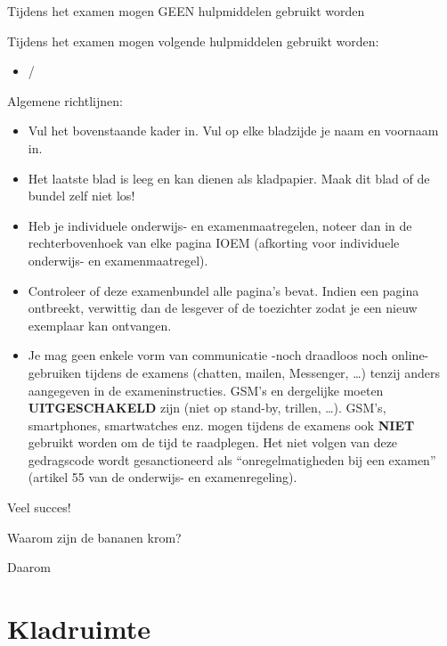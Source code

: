 \documentclass{exam}
\begin{document}
\hoofding


\XBox Tijdens het examen mogen GEEN hulpmiddelen gebruikt worden

\Square Tijdens het examen mogen volgende hulpmiddelen gebruikt worden:
\begin{itemize}
\item /
\end{itemize}

Algemene richtlijnen:

\begin{itemize}
  \item Vul het bovenstaande kader in. Vul op elke bladzijde je naam en voornaam in.
  \item Het laatste blad is leeg en kan dienen als kladpapier. Maak dit blad of de bundel zelf niet los!
  \item Heb je individuele onderwijs- en examenmaatregelen, noteer dan in de rechterbovenhoek van elke pagina IOEM (afkorting voor individuele onderwijs- en examenmaatregel).
  \item Controleer of deze examenbundel alle pagina’s bevat. Indien een pagina ontbreekt, verwittig dan de lesgever of de toezichter zodat je een nieuw exemplaar kan ontvangen.
  \item Je mag geen enkele vorm van communicatie -noch draadloos noch online- gebruiken tijdens de examens (chatten, mailen, Messenger, \ldots) tenzij anders aangegeven in de exameninstructies. GSM's en dergelijke moeten \textbf{UITGESCHAKELD} zijn (niet op stand-by, trillen, \ldots). GSM's, smartphones, smartwatches enz. mogen tijdens de examens ook \textbf{NIET} gebruikt worden om de tijd te raadplegen. Het niet volgen van deze gedragscode wordt gesanctioneerd als ``onregelmatigheden bij een examen'' (artikel 55 van de onderwijs- en examenregeling).
\end{itemize}

Veel succes!

\hrulefill

\begin{questions}

\framedsolutions
\ifsolution
  \printanswers
\else
  \noprintanswers
\fi


\question[10] Waarom zijn de bananen krom?

\begin{solutionordottedlines}[1cm]
  Daarom
\end{solutionordottedlines}

\end{questions}

\ifsolution
\else
\newpage
\section*{Kladruimte}

\fi
\end{document}
